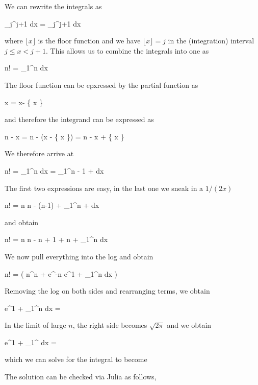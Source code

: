 We can rewrite the integrals as

\bee
\int_{j}^{j+1} dx = \int_{j}^{j+1} dx
\eee

where $\lfloor x \rfloor$ is the floor function and we have $\lfloor x \rfloor = j$ in the (integration) interval $j \leq x  < j+1$. This allows us to combine the integrals into one as

\bee
\log n! = \int_1^n dx
\eee

The floor function can be epxressed by the partial function as

\bee
\lfloor x \rfloor = x-  \{ x \}
\eee

and therefore the integrand can be expressed as

\bee
n - \lfloor x \rfloor = n - (x - \{ x \}) = n - x + \{ x \}
\eee

We therefore arrive at

\bee
\log n! = \int_1^n dx = \int_1^n  - 1 +  dx
\eee

The first two expressions are easy, in the last one we sneak in a $1/(2x)$

\bee
\log n! = n \log n - (n-1) + \int_1^n  +  dx
\eee

and obtain

\bee
\log n! = n \log n - n + 1 +  \log n + \int_1^n  dx
\eee

We now pull everything into the log and obtain

\bee
\log n! = \log \left( n^{n + } e^{-n} e^{1 + \int_1^n  dx} \right)
\eee

Removing the log on both sides and rearranging terms, we obtain

\bee
e^{1 + \int_1^n  dx} = 
\eee

In the limit of large $n$, the right side becomes $\sqrt{2\pi}$ and we obtain

\bee
e^{1 + \int_1^\infty {} dx} = \sqrt{2\pi}
\eee

which we can solve for the integral to become

\bee
{}
\eee
  

The solution can be checked via Julia as follows,

